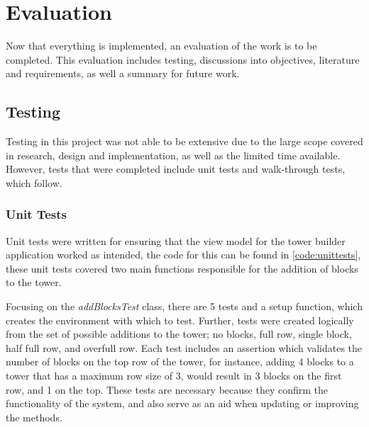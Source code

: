 
\chapter{Evaluation}\label{chap:evaluation}

Now that everything is implemented, an evaluation of the work is to be completed. This evaluation includes testing, discussions into objectives, literature and requirements, as well a summary for future work.

\section{Testing}

Testing in this project was not able to be extensive due to the large scope covered in research, design and implementation, as well as the limited time available. However, tests that were completed include unit tests and walk-through tests, which follow.

\subsection{Unit Tests}\label{unit}

Unit tests were written for ensuring that the view model for the tower builder application worked as intended, the code for this can be found in \cref{code:unittests}, these unit tests covered two main functions responsible for the addition of blocks to the tower.

Focusing on the \textit{addBlocksTest} class, there are 5 tests and a setup function, which creates the environment with which to test. Further, tests were created logically from the set of possible additions to the tower; no blocks, full row, single block, half full row, and overfull row. Each test includes an assertion which validates the number of blocks on the top row of the tower, for instance, adding 4 blocks to a tower that has a maximum row size of 3, would result in 3 blocks on the first row, and 1 on the top. These tests are necessary because they confirm the functionality of the system, and also serve as an aid when updating or improving the methods.

